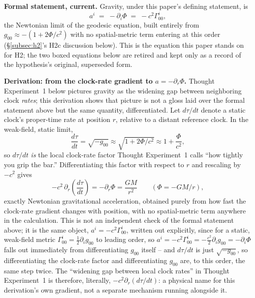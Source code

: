 \documentclass[12pt, a4paper]{article}
\begin{document}
\textbf{Formal statement, current.} Gravity, under this paper's
defining statement, is
\begin{equation}
a^i \;=\; -\partial_i\Phi \;=\; -c^2\Gamma^i_{00},
\end{equation}
the Newtonian limit of the geodesic equation, built entirely from
$g_{00}\approx-(1+2\Phi/c^2)$ with no spatial-metric term entering at
this order (\S\ref{subsec:h2}'s H2c discussion below). This is the
equation this paper stands on for H2; the two boxed equations below
are retired and kept only as a record of the hypothesis's original,
superseded form.

\textbf{Derivation: from the clock-rate gradient to $a=-\partial_r
\Phi$.} Thought Experiment~1 below pictures gravity as the widening
gap between neighboring clock \emph{rates}; this derivation shows
that picture is not a gloss laid over the formal statement above but
the same quantity, differentiated. Let $d\tau/dt$ denote a static
clock's proper-time rate at position $r$, relative to a distant
reference clock. In the weak-field, static limit,
\[
  \frac{d\tau}{dt} = \sqrt{-g_{00}} \approx \sqrt{1+2\Phi/c^2}
  \approx 1+\frac{\Phi}{c^2},
\]
so $d\tau/dt$ \emph{is} the local clock-rate factor Thought
Experiment~1 calls ``how tightly you grip the bar.'' Differentiating
this factor with respect to $r$ and rescaling by $-c^2$ gives
\[
  -c^2\,\partial_r\!\left(\frac{d\tau}{dt}\right) = -\partial_r\Phi
  = \frac{GM}{r^2} \qquad (\Phi=-GM/r),
\]
exactly Newtonian gravitational acceleration, obtained purely from
how fast the clock-rate gradient changes with position, with no
spatial-metric term anywhere in the calculation. This is not an
independent check of the formal statement above; it is the same
object, $a^i=-c^2\Gamma^i_{00}$, written out explicitly, since for a
static, weak-field metric $\Gamma^i_{00}=\tfrac12\partial_i g_{00}$
to leading order, so $a^i=-c^2\Gamma^i_{00}=-\tfrac{c^2}{2}\partial_i
g_{00}=-\partial_i\Phi$ falls out immediately from differentiating
$g_{00}$ itself -- and $d\tau/dt$ is just $\sqrt{-g_{00}}$, so
differentiating the clock-rate factor and differentiating $g_{00}$
are, to this order, the same step twice. The ``widening gap between
local clock rates'' in Thought Experiment~1 is therefore, literally,
$-c^2\partial_r(d\tau/dt)$: a physical name for this derivation's own
gradient, not a separate mechanism running alongside it.
\end{document}

